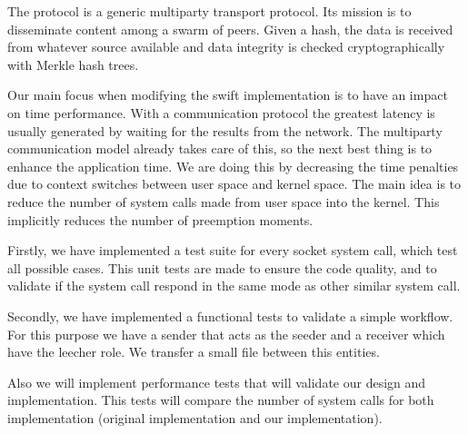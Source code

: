 The  protocol is a generic multiparty transport protocol. Its mission is to disseminate content among a swarm of peers. 
Given a hash, the data is received from whatever source available and data integrity is checked cryptographically with
Merkle hash trees. 

Our main focus when modifying the swift implementation is to have an impact on time performance. With a communication
protocol the greatest latency is usually generated by waiting for the results from the network. The multiparty
communication model already takes care of this, so the next best thing is to enhance the application time. We are doing
this by decreasing the time penalties due to context switches between user space and kernel space. The main idea is to
reduce the number of system calls made from user space into the kernel. This implicitly reduces the number of preemption
moments.

Firstly, we have implemented a test suite for every socket system call, which test all possible cases.  This unit tests
are made to ensure the code quality, and to validate if the system call respond in the same mode as other similar
system call. 

Secondly, we have implemented a functional tests to validate a simple workflow. For this purpose we have a sender that
acts as the seeder and a receiver which have the leecher role. We transfer a small file between this entities.  

Also we will implement performance tests that will validate our design and implementation. This tests will compare the
number of system calls for both implementation (original implementation and our implementation).
